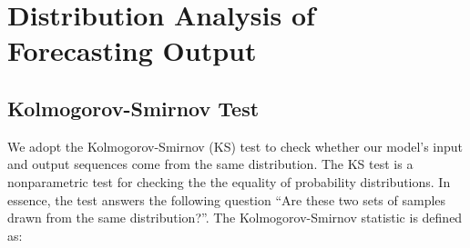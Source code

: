 \documentclass{article}
\begin{document}
\begin{table*}[h]
\centering
\caption{Noise injection studies. A 0.3* Gaussian noise is introduced into our training/testing. We conduct 4 sets of experiments with/without noise in training and test phases. The experiments are performed on ETTm1 and Electricity with different output lengths. The metric of variants is presented in relative value ('+' indicates degraded performance, and '-' indicates improved performance).}
\end{table*}
%
  \section{Distribution Analysis of Forecasting Output}
\label{app:Distribution}
\subsection{Kolmogorov-Smirnov Test}
We adopt the Kolmogorov-Smirnov (KS) test to check whether our model's input and output sequences come from the same distribution. The KS test is a nonparametric test for checking the the equality of probability distributions. In essence, the test answers the following question ``Are these two sets of samples drawn from the same distribution?''. 
The Kolmogorov-Smirnov statistic is defined as:
\end{document}
